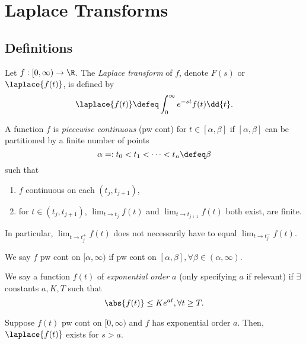 \section{Laplace Transforms}

\subsection{Definitions}

\begin{definition}
    Let $f : [0, \infty) \to \R$. The \emph{Laplace transform} of $f$, denote $F(s)$ or $\laplace{f(t)}$, is defined by \[
    \laplace{f(t)} \defeq \int_0^\infty e^{-st} f(t) \dd{t}.
    \]
\end{definition}

\begin{definition}
    A function $f$ is \emph{piecewise continuous} (pw cont) for $t \in [\alpha, \beta]$ if $[\alpha, \beta]$ can be partitioned by a finite number of points \[
    \alpha =: t_0 < t_1 < \cdots < t_n \defeq \beta    
    \]
    such that \begin{enumerate}[label=(\roman*)]
        \item $f$ continuous on each $(t_j, t_{j+1})$,
        \item for $t \in (t_j, t_{j+1})$, $\lim_{t \to t_j} f(t)$ and $\lim_{t \to t_{j+1}} f(t)$ both exist, are finite.
    \end{enumerate}
    In particular, $\lim_{t \to t_j^+} f(t)$ does not necessarily have to equal $\lim_{t \to t_j^-} f(t)$.

    We say $f$ pw cont on $[\alpha, \infty)$ if pw cont on $[\alpha, \beta], \forall \beta \in (\alpha, \infty)$.
\end{definition}

\begin{definition}
    We say a function $f(t)$ of \emph{exponential order $a$} (only specifying $a$ if relevant) if $\exists$ constants $a, K, T$ such that \[
    \abs{f(t)    } \leq K e^{at},  \forall t \geq T.
    \]
\end{definition}

\begin{theorem}
    Suppose $f(t)$ pw cont on $[0, \infty)$ and $f$ has exponential order $a$. Then, $\laplace{f(t)}$ exists for $s > a$.
\end{theorem}

